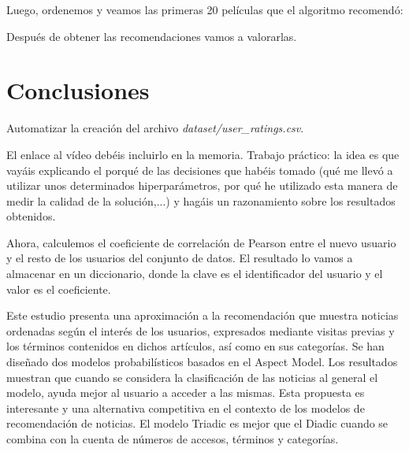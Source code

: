 \documentclass{uimppracticas}
\begin{document}
Luego, ordenemos y veamos las primeras 20 películas que el algoritmo recomendó:




Después de obtener las recomendaciones vamos a valorarlas. 

\newpage

\section{Conclusiones}

Automatizar la creación del archivo \textit{dataset/user\_ratings.csv}.

El enlace al vídeo debéis incluirlo en la memoria. Trabajo práctico: la idea es que vayáis explicando el porqué de las decisiones que habéis tomado (qué me llevó a utilizar unos determinados hiperparámetros, por qué he utilizado esta manera de medir la calidad de la solución,...) y hagáis un razonamiento sobre los resultados obtenidos.

Ahora, calculemos el coeficiente de correlación de Pearson entre el nuevo usuario y el resto de los usuarios del conjunto de datos. El resultado lo vamos a almacenar en un diccionario, donde la clave es el identificador del usuario y el valor es el coeficiente.


Este estudio presenta una aproximación a la recomendación que muestra
noticias ordenadas según el interés de los usuarios, expresados mediante
visitas previas y los términos contenidos en dichos artículos, así como en sus
categorías.
Se han diseñado dos modelos probabilísticos basados en el Aspect Model.
Los resultados muestran que cuando se considera la clasificación de las
noticias al general el modelo, ayuda mejor al usuario a acceder a las mismas.
Esta propuesta es interesante y una alternativa competitiva en el contexto de
los modelos de recomendación de noticias.
El modelo Triadic es mejor que el Diadic cuando se combina con la cuenta de
números de accesos, términos y categorías.


\newpage

\renewcommand{\refname}{Bibliografía}


	
\end{document}

